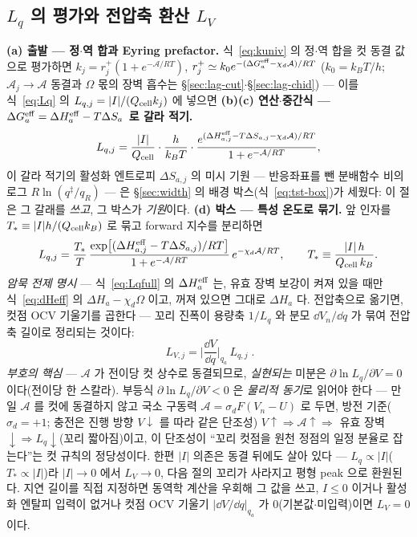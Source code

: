 \subsection{$L_q$ 의 평가와 전압축 환산 $L_V$}\label{sec:lag-LV}
\textbf{(a) 출발 --- 정$\cdot$역 합과 Eyring prefactor.} 식~\eqref{eq:kuniv} 의 정$\cdot$역 합을 컷 동결
값으로 평가하면 $k_j=r_j^+(1+e^{-\mathcal A/RT})$, $r_j^+\simeq k_0e^{-(\Delta G_a^{\mathrm{eff}}-\chi_d\mathcal A)/RT}$
($k_0=k_BT/h$; $\mathcal A_j\to\mathcal A$ 동결과 $\Omega$ 몫의 장벽 흡수는 \S\ref{sec:lag-cut}$\cdot$\S\ref{sec:lag-chid})
--- 이를 식~\eqref{eq:Lq} 의 $L_{q,j}=|I|/(Q_{\mathrm{cell}} k_j)$
에 넣으면 \textbf{(b)(c) 연산$\cdot$중간식 --- $\Delta G_a^{\mathrm{eff}}=\Delta H_a^{\mathrm{eff}}-T\Delta S_a$ 로 갈라 적기.}
\begin{equation}
L_{q,j}=\frac{|I|}{Q_{\mathrm{cell}}}\cdot\frac{h}{k_BT}\cdot
\frac{e^{(\Delta H_{a,j}^{\mathrm{eff}}-T\Delta S_{a,j}-\chi_d\mathcal A)/RT}}{1+e^{-\mathcal A/RT}},
\label{eq:Lqmid2}
\end{equation}
이 갈라 적기의 활성화 엔트로피 $\Delta S_{a,j}$ 의 미시 기원 --- 반응좌표를 뺀 분배함수 비의 로그
$R\ln(q^{\ddagger}/q_R)$ --- 은 \S\ref{sec:width} 의 배경 박스(식~\eqref{eq:tst-box})가 세웠다: 이 절은 그
갈래를 \emph{쓰고}, 그 박스가 \emph{기원}이다.
\textbf{(d) 박스 --- 특성 온도로 묶기.} 앞 인자를 $T_*\equiv|I|h/(Q_{\mathrm{cell}} k_B)$ 로 묶고 forward 지수를 분리하면
\begin{equation}
L_{q,j}=\frac{T_*}{T}\,\frac{\exp\!\big[(\Delta H_{a,j}^{\mathrm{eff}}-T\Delta S_{a,j})/RT\big]}{1+e^{-\mathcal A/RT}}
\,e^{-\chi_d\mathcal A/RT},
\qquad T_*\equiv\frac{|I|\,h}{Q_{\mathrm{cell}}\,k_B}.
\label{eq:Lqfull}
\end{equation}
\emph{암묵 전제 명시} --- 식~\eqref{eq:Lqfull} 의
$\Delta H_a^{\mathrm{eff}}$ 는, 유효 장벽 보강이 켜져 있을 때만 식~\eqref{eq:dHeff} 의 $\Delta H_a-\chi_d\Omega$ 이고,
꺼져 있으면 그대로 $\Delta H_a$ 다. 전압축으로 옮기면, 컷점 OCV 기울기를 곱한다 --- 꼬리 진폭이
용량축 $1/L_q$ 와 분모 $\dd V_n/\dd q$ 가 묶여 전압축 길이로 정리되는 것이다:
\begin{equation}
\boxed{\;L_{V,j}=\Big|\frac{\dd V}{\dd q}\Big|_{q_a}\,L_{q,j}\;.}
\label{eq:LV}
\end{equation}
\emph{부호의 핵심} --- $\mathcal A$ 가 전이당 컷 상수로 동결되므로, \emph{실현되는} 미분은
$\partial\ln L_q/\partial V=0$ 이다(전이당 한 스칼라). 부등식 $\partial\ln L_q/\partial V<0$ 은 \emph{물리적 동기}로 읽어야
한다 --- 만일 $\mathcal A$ 를 컷에 동결하지 않고 국소 구동력 $\mathcal A=\sigma_dF(V_n-U)$ 로 두면, 방전
기준($\sigma_d=+1$; 충전은 진행 방향 $V\!\downarrow$ 를 따라 같은 단조성) $V\!\uparrow\Rightarrow
\mathcal A\!\uparrow\Rightarrow$ 유효 장벽$\downarrow\Rightarrow L_q\downarrow$(꼬리 짧아짐)이고, 이 단조성이 ``꼬리 컷점을
원천 정점의 일정 분율로 잡는다''는 컷 규칙의 정당성이다. 한편 $|I|$ 의존은 동결 뒤에도 살아 있다 --- $L_q\propto|I|$($T_*\propto|I|$)라 $|I|\to0$
에서 $L_V\to0$, 다음 절의 꼬리가 사라지고 평형 peak 으로 환원된다. 지연 길이를 직접 지정하면 동역학 계산을 우회해
그 값을 쓰고, $I\le0$ 이거나 활성화 엔탈피 입력이 없거나 컷점 OCV 기울기 $|\dd V/\dd q|_{q_a}$ 가
$0$(기본값$\cdot$미입력)이면 $L_V=0$ 이다.

